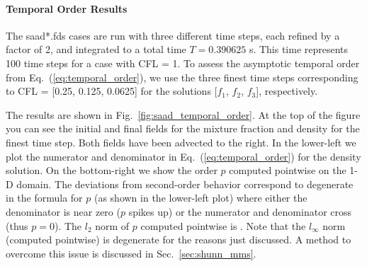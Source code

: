 \documentclass[11pt]{book}
\begin{document}
\paragraph{Temporal Order Results} The {\ct saad*.fds} cases are run with three different time steps, each refined by a factor of 2, and integrated to a total time $T=0.390625$ s.  This time represents 100 time steps for a case with CFL = 1.  To assess the asymptotic temporal order from Eq.~(\ref{eq:temporal_order}), we use the three finest time steps corresponding to CFL = [0.25, 0.125, 0.0625] for the solutions [$f_1$, $f_2$, $f_3$], respectively.

The results are shown in Fig.~\ref{fig:saad_temporal_order}.  At the top of the figure you can see the initial and final fields for the mixture fraction and density for the finest time step.  Both fields have been advected to the right.  In the lower-left we plot the numerator and denominator in Eq.~(\ref{eq:temporal_order}) for the density solution.  On the bottom-right we show the order $p$ computed pointwise on the 1-D domain. The deviations from second-order behavior correspond to degenerate in the formula for $p$ (as shown in the lower-left plot) where either the denominator is near zero ($p$ spikes up) or the numerator and denominator cross (thus $p=0$).  The $l_2$ norm of $p$ computed pointwise is \!.  Note that the $l_\infty$ norm (computed pointwise) is degenerate for the reasons just discussed.  A method to overcome this issue is discussed in Sec.~\ref{sec:shunn_mms}.
\end{document}
